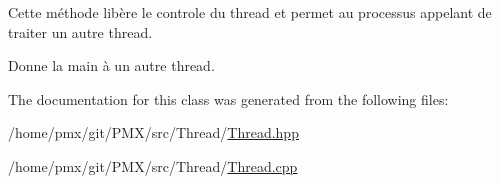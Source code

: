 Cette méthode libère le controle du thread et permet au processus appelant de traiter un autre thread. 

Donne la main à un autre thread. 

The documentation for this class was generated from the following files\+:\begin{DoxyCompactItemize}
\item 
/home/pmx/git/\+P\+M\+X/src/\+Thread/\hyperlink{Thread_8hpp}{Thread.\+hpp}\item 
/home/pmx/git/\+P\+M\+X/src/\+Thread/\hyperlink{Thread_8cpp}{Thread.\+cpp}\end{DoxyCompactItemize}
